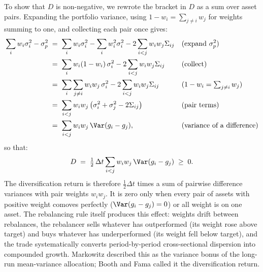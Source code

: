 To show that $D$ is non-negative, we rewrote the bracket in $D$ as a
sum over asset pairs. Expanding the portfolio variance, using
$1 - w_i = \sum_{j \ne i} w_j$ for weights summing to one, and
collecting each pair once gives:
\begin{align}
  \sum_i w_i \sigma_i^2 - \sigma_p^2
   &\;=\; \sum_i w_i \sigma_i^2 - \sum_i w_i^2 \sigma_i^2
     - 2 \sum_{i<j} w_i w_j \Sigma_{ij}
     && \text{(expand $\sigma_p^2$)} \notag \\
   &\;=\; \sum_i w_i (1 - w_i)\, \sigma_i^2
     - 2 \sum_{i<j} w_i w_j \Sigma_{ij}
     && \text{(collect)} \notag \\
   &\;=\; \sum_i \sum_{j \ne i} w_i w_j\, \sigma_i^2
     - 2 \sum_{i<j} w_i w_j \Sigma_{ij}
     && \text{($1 - w_i = \textstyle\sum_{j \ne i} w_j$)} \notag \\
   &\;=\; \sum_{i<j} w_i w_j
     \left(\sigma_i^2 + \sigma_j^2 - 2\Sigma_{ij}\right)
     && \text{(pair terms)} \notag \\
   &\;=\; \sum_{i<j} w_i w_j \,\Var(g_i - g_j),
     && \text{(variance of a difference)}
  \label{eq:pair-identity}
\end{align}
so that:
\begin{equation}
  D \;=\; \tfrac{1}{2}\,\Delta t \sum_{i<j} w_i w_j \,\Var(g_i - g_j)
  \;\ge\; 0.
  \label{eq:dr-pairwise}
\end{equation}
The diversification return is therefore $\tfrac{1}{2}\Delta t$ times
a sum of pairwise difference variances with pair weights $w_i w_j$.
It is zero only when every pair of assets with positive weight
comoves perfectly ($\Var(g_i - g_j) = 0$) or all weight is on one
asset. The rebalancing rule itself produces
this effect: weights drift between rebalances, the rebalancer sells
whatever has outperformed (its weight rose above target) and buys
whatever has underperformed (its weight fell below target), and the
trade systematically converts period-by-period cross-sectional
dispersion into compounded growth. Markowitz
\cite{markowitz1976longRun} described this as the variance bonus of
the long-run mean-variance allocation; Booth and Fama
\cite{boothFama1992} called it the diversification return.

